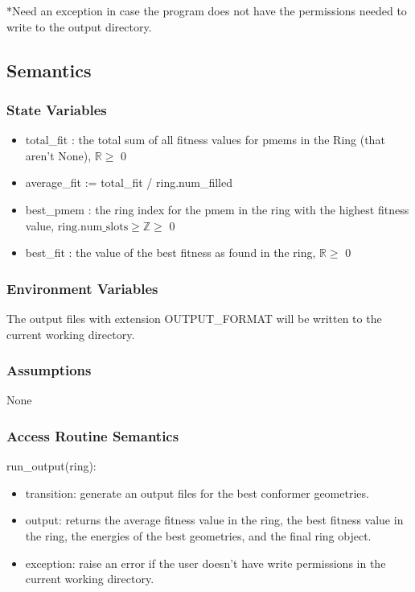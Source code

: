 \documentclass[12pt, titlepage]{article}
\begin{document}
*Need an exception in case the program does not have the permissions 
needed to write to the output directory.

\subsection{Semantics}

\subsubsection{State Variables}

\begin{itemize}
\item total\_fit : the total sum of all fitness values for pmems in the Ring 
(that aren't None), $\mathbb{R} \geq$ 0
\item average\_fit := total\_fit / ring.num\_filled
\item best\_pmem : the ring index for the pmem in the ring with the highest 
fitness value, $\text{ring.num\_slots} \geq \mathbb{Z} \geq$ 0
\item best\_fit : the value of the best fitness as found in the ring,  
$\mathbb{R} \geq$ 0
\end{itemize}


\subsubsection{Environment Variables}

The output files with extension OUTPUT\_FORMAT will be written to the current 
working directory.

\subsubsection{Assumptions}

None

\subsubsection{Access Routine Semantics}

\noindent run\_output(ring):
\begin{itemize}
	\item transition: generate an output files for the best conformer 
	geometries.
	\item output: returns the average fitness value in the ring, the best 
	fitness value in the ring, the energies of the best geometries, and the 
	final ring object.
	\item exception: raise an error if the user doesn't have write permissions 
	in the current working directory.
\end{itemize}
\end{document}

